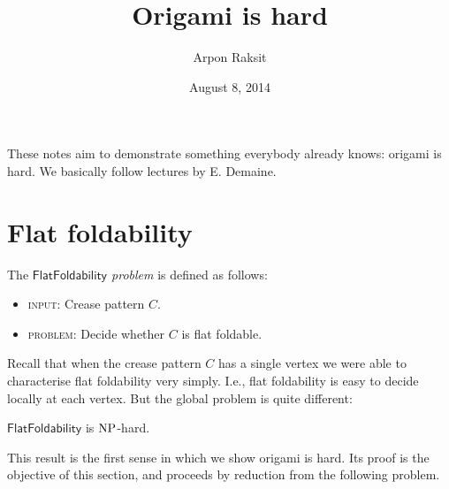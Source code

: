 


\usepackage{graphicx}
\usepackage{subcaption}


\title{Origami is hard}
\author{Arpon Raksit}
\date{August 8, 2014}


\maketitle
\thispagestyle{fancy}


These notes aim to demonstrate something everybody already knows:
origami is hard. We basically follow lectures
\cite{demaine-GFALOP-lecture} by E. Demaine.


\section{Flat foldability}

\newcommand{\FlatFoldability}{\mathsf{FlatFoldability}}
\newcommand{\NAE}{\mathsf{NotAllEqual\dash 3\dash SAT}}

\begin{definition}
  The \emph{$\FlatFoldability$ problem} is defined as follows:
  \begin{itemize}
  \item \textsc{input}: Crease pattern $C$.
  \item \textsc{problem}: Decide whether $C$ is flat foldable.
  \end{itemize}
\end{definition}

Recall that when the crease pattern $C$ has a single vertex we were
able to characterise flat foldability very simply. I.e., flat
foldability is easy to decide locally at each vertex. But the global
problem is quite different:

\begin{theorem}
  \label{flat-np}
  $\FlatFoldability$ is $\mathrm{NP}$-hard.
\end{theorem}

This result is the first sense in which we show origami is hard. Its
proof is the objective of this section, and proceeds by reduction from
the following problem.

